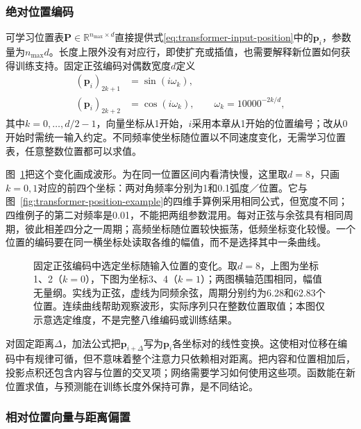 \subsubsection{绝对位置编码}

可学习位置表$\bm P\in\mathbb R^{n_{\max}\times d}$直接提供式\eqref{eq:transformer-input-position}中的$\bm p_i$，参数量为$n_{\max}d$。长度上限外没有对应行，即使扩充或插值，也需要解释新位置如何获得训练支持。固定正弦编码对偶数宽度$d$定义
\begin{equation}
  \begin{aligned}
    (\bm p_i)_{2k+1}&=\sin(i\omega_k),\\
    (\bm p_i)_{2k+2}&=\cos(i\omega_k),\qquad
    \omega_k=10000^{-2k/d},
  \end{aligned}
  \label{eq:transformer-sinusoidal-position}
\end{equation}
其中$k=0,\ldots,d/2-1$，向量坐标从1开始，$i$采用本章从1开始的位置编号；改从0开始时需统一输入约定。不同频率使坐标随位置以不同速度变化，无需学习位置表，任意整数位置都可以求值。

图~\ref{fig:transformer-position-waves}把这个变化画成波形。为在同一位置区间内看清快慢，这里取$d=8$，只画$k=0,1$对应的前四个坐标：两对角频率分别为1和0.1弧度／位置。它与图~\ref{fig:transformer-position-example}的四维手算例采用相同公式，但宽度不同；四维例子的第二对频率是0.01，不能把两组参数混用。每对正弦与余弦具有相同周期，彼此相差四分之一周期；高频坐标随位置较快振荡，低频坐标变化较慢。一个位置的编码要在同一横坐标处读取各维的幅值，而不是选择其中一条曲线。

\begin{figure}[htbp]
  \centering
  
  \caption{固定正弦编码中选定坐标随输入位置的变化。取$d=8$，上图为坐标1、2（$k=0$），下图为坐标3、4（$k=1$）；两图横轴范围相同，幅值无量纲。实线为正弦，虚线为同频余弦，周期分别约为6.28和62.83个位置。连续曲线帮助观察波形，实际序列只在整数位置取值；本图仅示意选定维度，不是完整八维编码或训练结果。}
  \label{fig:transformer-position-waves}
\end{figure}
\FloatBarrier

对固定距离$\Delta$，加法公式把$\bm p_{i+\Delta}$写为$\bm p_i$各坐标对的线性变换。这使相对位移在编码中有规律可循，但不意味着整个注意力只依赖相对距离。把内容和位置相加后，投影点积还包含内容与位置的交叉项；网络需要学习如何使用这些项。函数能在新位置求值，与预测能在训练长度外保持可靠，是不同结论。

\subsubsection{相对位置向量与距离偏置}

